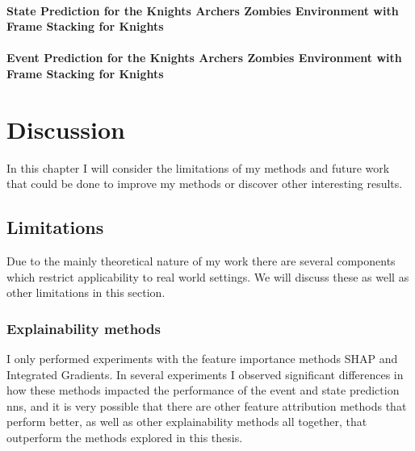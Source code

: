 \documentclass[UKenglish]{uiomasterthesis}
\begin{document}
\subsubsection{State Prediction for the Knights Archers Zombies Environment with Frame Stacking for Knights}

\subsubsection{Event Prediction for the Knights Archers Zombies Environment with Frame Stacking for Knights}

\chapter{Discussion}
\label{chap:disc}
In this chapter I will consider the limitations of my methods and future work that could be done to improve my methods or discover other interesting results.

\section{Limitations}
Due to the mainly theoretical nature of my work there are several components which restrict applicability to real world settings. We will discuss these as well as other limitations in this section.

\subsection{Explainability methods}
I only performed experiments with the feature importance methods SHAP and Integrated Gradients. In several experiments I observed significant differences in how these methods impacted the performance of the event and state prediction \acp{nn}, and it is very possible that there are other feature attribution methods that perform better, as well as other explainability methods all together, that outperform the methods explored in this thesis.
\end{document}

